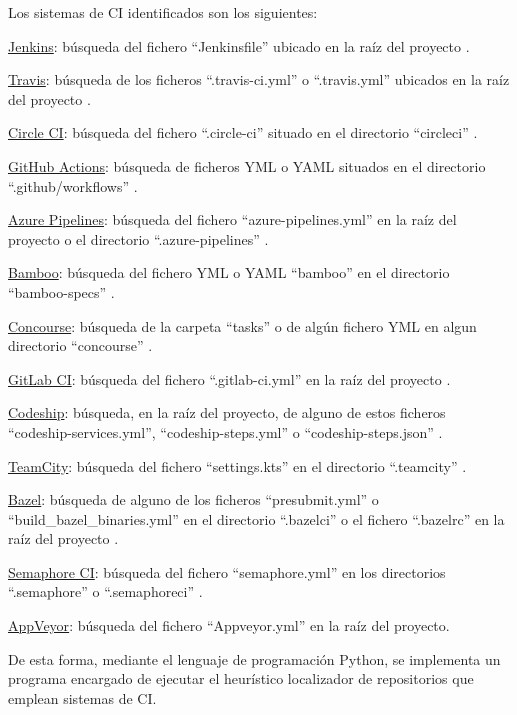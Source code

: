 Los sistemas de CI identificados son los siguientes:
\begin{compactitem}
    \item \underline{Jenkins}: búsqueda del fichero ``Jenkinsfile'' ubicado en la raíz del proyecto \cite{jenkins}.
    \item \underline{Travis}: búsqueda de los ficheros ``.travis-ci.yml'' o ``.travis.yml'' ubicados en la raíz del proyecto \cite{travisCI}.
    \item \underline{Circle CI}: búsqueda del fichero ``.circle-ci'' situado en el directorio ``circleci'' \cite{circleCI}.
    \item \underline{GitHub Actions}: búsqueda de ficheros YML o YAML situados en el directorio ``.github/workflows'' \cite{githubActions}.
    \item \underline{Azure Pipelines}: búsqueda del fichero ``azure-pipelines.yml'' en la raíz del proyecto o el directorio ``.azure-pipelines'' \cite{azurePipelines}.
    \item \underline{Bamboo}: búsqueda del fichero YML o YAML ``bamboo'' en el directorio ``bamboo-specs'' \cite{bamboo}.
    \item \underline{Concourse}: búsqueda de la carpeta ``tasks'' o de algún fichero YML en algun directorio ``concourse'' \cite{concourse}.
    \item \underline{GitLab CI}: búsqueda del fichero ``.gitlab-ci.yml'' en la raíz del proyecto \cite{gitlabCI}.
    \item \underline{Codeship}: búsqueda, en la raíz del proyecto, de alguno de estos ficheros ``codeship-services.yml'', ``codeship-steps.yml'' o ``codeship-steps.json'' \cite{codeship}.
    \item \underline{TeamCity}: búsqueda del fichero ``settings.kts'' en el directorio ``.teamcity'' \cite{teamcity}.
    \item \underline{Bazel}: búsqueda de alguno de los ficheros ``presubmit.yml'' o ``build\_bazel\_binaries.yml'' en el directorio ``.bazelci'' o el fichero ``.bazelrc'' en la raíz del proyecto \cite{bazel}.
    \item \underline{Semaphore CI}: búsqueda del fichero ``semaphore.yml'' en los directorios ``.semaphore'' o ``.semaphoreci'' \cite{semaphoreCI}.
    \item \underline{AppVeyor}: búsqueda del fichero ``Appveyor.yml'' en la raíz del proyecto.
\end{compactitem}
	
De esta forma, mediante el lenguaje de programación Python, se implementa un programa encargado de ejecutar el heurístico localizador de repositorios que emplean sistemas de CI.

